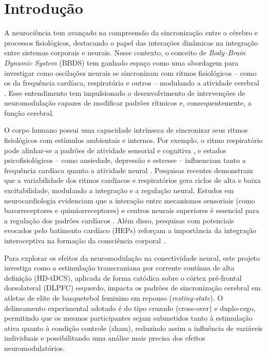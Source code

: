 \chapter{Introdução}
\label{chap:introducao}

A neurociência tem avançado na compreensão da sincronização entre o cérebro e processos fisiológicos, destacando o papel das interações dinâmicas na integração entre sistemas corporais e neurais. Nesse contexto, o conceito de \textit{Body–Brain Dynamic System} (BBDS) tem ganhado espaço como uma abordagem para investigar como oscilações neurais se sincronizam com ritmos fisiológicos – como os da frequência cardíaca, respiratória e outros – modulando a atividade cerebral \cite{criscuolo2022cognition, cohen2017where}. Esse entendimento tem impulsionado o desenvolvimento de intervenções de neuromodulação capazes de modificar padrões rítmicos e, consequentemente, a função cerebral.

O corpo humano possui uma capacidade intrínseca de sincronizar seus ritmos fisiológicos com estímulos ambientais e internos. Por exemplo, o ritmo respiratório pode alinhar-se a padrões de atividade sensorial e cognitiva \cite{haas1985effects}, e estados psicofisiológicos – como ansiedade, depressão e estresse – influenciam tanto a frequência cardíaca quanto a atividade neural \cite{criscuolo2022cognition}. Pesquisas recentes demonstram que a variabilidade dos ritmos cardíacos e respiratórios gera ciclos de alta e baixa excitabilidade, modulando a integração e a regulação neural. Estudos em neurocardiologia evidenciam que a interação entre mecanismos sensoriais (como barorreceptores e quimiorreceptores) e centros neurais superiores é essencial para a regulação dos padrões cardíacos \cite{marcondes2024linguagem}. Além disso, pesquisas com potenciais evocados pelo batimento cardíaco (HEPs) reforçam a importância da integração interoceptiva na formação da consciência corporal \cite{park2018neural, banelli2020skipping, mackinnon2013utilizing}.

Para explorar os efeitos da neuromodulação na conectividade neural, este projeto investiga como a estimulação transcraniana por corrente contínua de alta definição (HD-tDCS), aplicada de forma catódica sobre o córtex pré-frontal dorsolateral (DLPFC) esquerdo, impacta os padrões de sincronização cerebral em atletas de elite de basquetebol feminino em repouso (\textit{resting-state}). O delineamento experimental adotado é do tipo cruzado (cross-over) e duplo-cego, permitindo que os mesmos participantes sejam submetidos tanto à estimulação ativa quanto à condição controle (sham), reduzindo assim a influência de variáveis individuais e possibilitando uma análise mais precisa dos efeitos neuromodulatórios.

